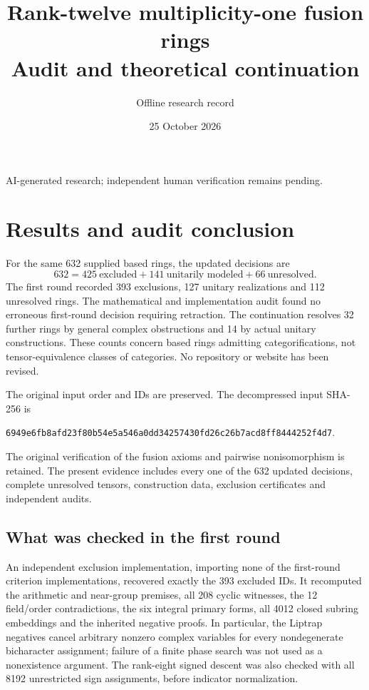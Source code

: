 \documentclass[11pt]{article}
\title{Rank-twelve multiplicity-one fusion rings\\\large Audit and theoretical continuation}
\author{Offline research record}\date{25 October 2026}
\begin{document}
\maketitle
\begin{center}\small AI-generated research; independent human verification remains pending.\end{center}

\section{Results and audit conclusion}
For the same 632 supplied based rings, the updated decisions are
\[
 \boxed{632=425\ \text{excluded}+141\ \text{unitarily modeled}+66\ \text{unresolved}.}
\]
The first round recorded 393 exclusions, 127 unitary realizations and 112 unresolved
rings. The mathematical and implementation audit found no erroneous first-round
decision requiring retraction. The continuation resolves 32 further rings
by general complex obstructions and 14 by actual unitary constructions.
These counts concern based rings admitting categorifications, not tensor-equivalence
classes of categories. No repository or website has been revised.

The original input order and IDs are preserved. The decompressed input SHA-256 is
\begin{center}\scriptsize\texttt{6949e6fb8afd23f80b54e5a546a0dd34257430fd26c26b7acd8ff8444252f4d7}.\end{center}
The original verification of the fusion axioms and pairwise nonisomorphism is retained.
The present evidence includes every one of the 632 updated decisions, complete
unresolved tensors, construction data, exclusion certificates and independent audits.

\subsection*{What was checked in the first round}
An independent exclusion implementation, importing none of the first-round criterion
implementations, recovered exactly the 393 excluded IDs. It recomputed the arithmetic
and near-group premises, all 208 cyclic witnesses, the 12 field/order contradictions,
the six integral primary forms, all 4012 closed subring embeddings and the inherited
negative proofs. In particular, the Liptrap negatives cancel arbitrary nonzero complex
variables for every nondegenerate bicharacter assignment; failure of a finite phase
search was not used as a nonexistence argument. The rank-eight signed descent was
also checked with all 8192 unrestricted sign assignments, before indicator normalization.
\end{document}

